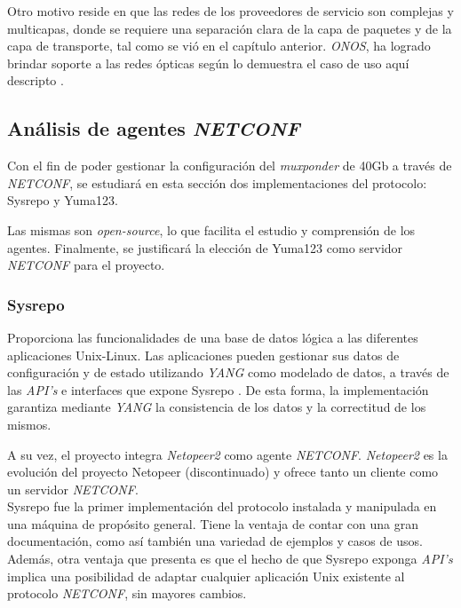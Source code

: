 Otro motivo reside en que las redes de los proveedores de servicio son complejas y multicapas, donde se requiere una separación clara de la capa de paquetes y de la capa de transporte, tal como se vió en el capítulo anterior. \textit{ONOS}, ha logrado brindar soporte a las redes ópticas según lo demuestra el caso de uso aquí descripto \parencite{onffwhite}.

\subsection{Análisis de agentes \textit{NETCONF}}

Con el fin de poder gestionar la configuración del \textit{muxponder} de 40Gb a través de \textit{NETCONF}, se estudiará en esta sección dos implementaciones del protocolo: Sysrepo y Yuma123. 

Las mismas son \textit{open-source}, lo que facilita el estudio y comprensión de los agentes. Finalmente, se justificará la elección de Yuma123 como servidor \textit{NETCONF} para el proyecto.

\subsubsection{Sysrepo}
Proporciona las funcionalidades de una base de datos lógica a las diferentes aplicaciones Unix-Linux. Las aplicaciones pueden gestionar sus datos de configuración y de estado utilizando \textit{YANG} como modelado de datos, a través de las \textit{API’s} e interfaces que expone Sysrepo \parencite{sysrepogit}. De esta forma, la implementación garantiza mediante \textit{YANG} la consistencia de los datos y la correctitud de los mismos. 

A su vez, el proyecto integra \textit{Netopeer2} \parencite{netopeergit} como agente \textit{NETCONF}. \textit{Netopeer2} es la evolución del proyecto Netopeer \parencite{netopeergit1} (discontinuado) y ofrece tanto un cliente como un servidor \textit{NETCONF}.
\\

Sysrepo fue la primer implementación del protocolo instalada y manipulada en una máquina de propósito general. Tiene la ventaja de contar con una gran documentación, como así también una variedad de ejemplos y casos de usos. Además, otra ventaja que presenta es que el hecho de que Sysrepo exponga \textit{API’s} implica una posibilidad de adaptar cualquier aplicación Unix existente al protocolo \textit{NETCONF}, sin mayores cambios.  

